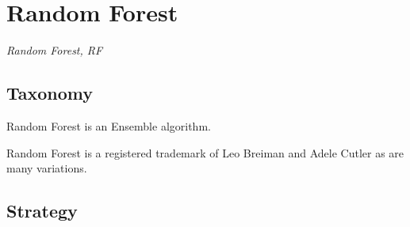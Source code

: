 
\section{Random Forest} 
\label{sec:randomforest}

\emph{Random Forest, RF}

\subsection{Taxonomy}
Random Forest is an Ensemble algorithm. 

Random Forest is a registered trademark of Leo Breiman and Adele Cutler as are many variations.

\subsection{Strategy}

